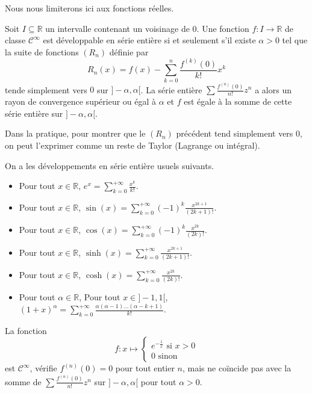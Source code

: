 	Nous nous limiterons ici aux fonctions réelles.
	
	\begin{proposition}
		Soit $I \subseteq \mathbb{R}$ un intervalle contenant un voisinage de $0$. Une fonction $f : I \rightarrow \mathbb{R}$ de classe $\mathcal{C}^\infty$ est développable en série entière si et seulement s'il existe $\alpha > 0$ tel que la suite de fonctions $(R_n)$ définie par
		\[ R_n(x) = f(x) - \sum_{k=0}^{n} \frac{f^{(k)}(0)}{k!} x^k \]
		tende simplement vers $0$ sur $]-\alpha, \alpha[$. La série entière $\sum \frac{f^{(n)}(0)}{n!} z^n$ a alors un rayon de convergence supérieur ou égal à $\alpha$ et $f$ est égale à la somme de cette série entière sur $]-\alpha,\alpha[$.
	\end{proposition}
	
	\begin{remark}
		Dans la pratique, pour montrer que le $(R_n)$ précédent tend simplement vers $0$, on peut l'exprimer comme un reste de Taylor (Lagrange ou intégral).
	\end{remark}
	
	\begin{example}
		On a les développements en série entière usuels suivants.
		\begin{itemize}
			\item Pour tout $x \in \mathbb{R}$, $e^x = \sum_{k=0}^{+\infty} \frac{x^k}{k!}$.
			\item Pour tout $x \in \mathbb{R}$, $\sin(x) = \sum_{k=0}^{+\infty} (-1)^{k} \frac{x^{2k+1}}{(2k+1)!}$.
			\item Pour tout $x \in \mathbb{R}$, $\cos(x) = \sum_{k=0}^{+\infty} (-1)^{k} \frac{x^{2k}}{(2k)!}$.
			\item Pour tout $x \in \mathbb{R}$, $\sinh(x) = \sum_{k=0}^{+\infty} \frac{x^{2k+1}}{(2k+1)!}$.
			\item Pour tout $x \in \mathbb{R}$, $\cosh(x) = \sum_{k=0}^{+\infty} \frac{x^{2k}}{(2k)!}$.
			\item Pour tout $\alpha \in \mathbb{R}$, Pour tout $x \in ]-1,1[$, $(1+x)^\alpha = \sum_{k=0}^{+\infty} \frac{\alpha(\alpha - 1) \dots (\alpha -k+1)}{k!}$.
		\end{itemize}
	\end{example}
	
	\begin{cexample}
		La fonction
		\[
		f : x \mapsto \begin{cases}
			e^{-\frac{1}{x}} \text{ si } x > 0 \\
			0 \text{ sinon}
		\end{cases}
		\]
		est $\mathcal{C}^\infty$, vérifie $f^{(n)}(0) = 0$ pour tout entier $n$, mais ne coïncide pas avec la somme de $\sum \frac{f^{(n)}(0)}{n!} z^n$ sur $]-\alpha,\alpha[$ pour tout $\alpha > 0$.
	\end{cexample}
	
